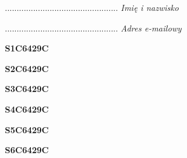 \begin{turn}{90}\begin{minipage}{\linewidth} \vspace{20mm} ................................................  \textit{Imię i nazwisko}\end{minipage}\end{turn}

\begin{turn}{90}\begin{minipage}{\linewidth} \vspace{20mm} ................................................  \textit{Adres e-mailowy}\end{minipage}\end{turn}

\begin{turn}{90}\huge \begin{minipage}{\linewidth} \vspace{10mm}\textbf{S1C6429C}\end{minipage}\end{turn}

\begin{turn}{90}\huge \begin{minipage}{\linewidth} \vspace{10mm}\textbf{S2C6429C}\end{minipage}\end{turn}

\begin{turn}{90}\huge \begin{minipage}{\linewidth} \vspace{10mm}\textbf{S3C6429C}\end{minipage}\end{turn}

\begin{turn}{90}\huge \begin{minipage}{\linewidth} \vspace{10mm}\textbf{S4C6429C}\end{minipage}\end{turn}

\begin{turn}{90}\huge \begin{minipage}{\linewidth} \vspace{10mm}\textbf{S5C6429C}\end{minipage}\end{turn}

\begin{turn}{90}\huge \begin{minipage}{\linewidth} \vspace{10mm}\textbf{S6C6429C}\end{minipage}\end{turn}

